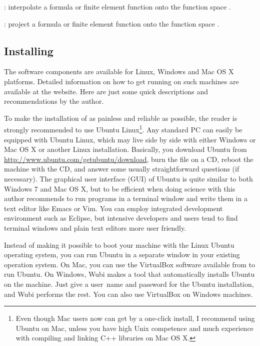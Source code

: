 : interpolate a formula or finite element
function  onto the function space .\gln

: project a formula or finite element function
 onto the function space .\gln

\subsection{Installing \fenics}
\label{langtangen:app:install}
\label{installing FEniCS}

The \fenics{} software components are available for Linux, Windows and
Mac OS X platforms. Detailed information on how to get \fenics{} running
on such machines are available at the  website.
Here are just some quick descriptions and recommendations by the author.

To make the installation of \fenics{} as painless and reliable
as possible, the reader is strongly recommended to use Ubuntu
Linux\footnote{Even though Mac users now can get \fenics{} by a
  one-click install, I recommend using Ubuntu on Mac, unless you have
  high Unix competence and much experience with compiling and linking C++
  libraries on Mac OS X.}. Any standard PC can easily be equipped
with Ubuntu Linux, which may live side by side with either Windows
or Mac OS X or another Linux installation.  Basically, you download
Ubuntu from \url{http://www.ubuntu.com/getubuntu/download}, burn the
file on a CD, reboot the machine with the CD, and answer some usually
straightforward questions (if necessary). The graphical user interface
(GUI) of Ubuntu is quite similar to both Windows 7 and Mac OS X, but to
be efficient when doing science with \fenics{} this author recommends
to run programs in a terminal window and write them in a text editor
like Emacs or Vim. You can employ integrated development environment
such as Eclipse, but intensive \fenics{} developers and users tend to
find terminal windows and plain text editors more user friendly.

Instead of making it possible to boot your machine with the Linux
Ubuntu operating system, you can run Ubuntu in a separate window in
your existing operation system. On Mac, you can use the VirtualBox
software available from  to run
Ubuntu. On Windows, Wubi makes a tool that automatically installs
Ubuntu on the machine. Just give a user~name and password for the
Ubuntu installation, and Wubi performs the rest. You can also use
VirtualBox on Windows machines.

